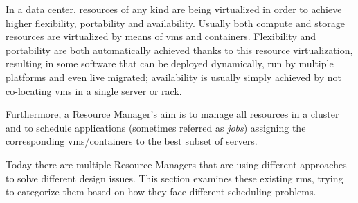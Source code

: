 In a data center, resources of any kind are being virtualized in order to achieve higher flexibility, portability and availability.
Usually both compute and storage resources are virtualized by means of \glspl{vm} and containers.
Flexibility and portability are both automatically achieved thanks to this resource virtualization, resulting in some software that can be deployed dynamically, run by multiple platforms and even live migrated; availability is usually simply achieved by not co-locating \glspl{vm} in a single server or rack.

Furthermore, a Resource Manager's aim is to manage all resources in a cluster and to schedule applications (sometimes referred as \textit{jobs}) assigning the corresponding \glspl{vm}/containers to the best subset of servers.

Today there are multiple Resource Managers that are using different approaches to solve different design issues.
This section examines these existing \glspl{rm}, trying to categorize them based on how they face different scheduling problems.